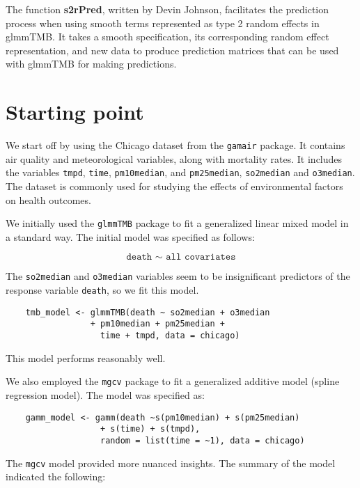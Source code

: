 
The function \textbf{s2rPred}, written by Devin Johnson, facilitates the prediction process when using smooth terms represented as type 2 random effects in glmmTMB. It takes a smooth specification, its corresponding random effect representation, and new data to produce prediction matrices that can be used with glmmTMB for making predictions.
\newline


\section{Starting point}

We start off by using the Chicago dataset from the \texttt{gamair} package. It contains air quality and meteorological variables, along with mortality rates. It includes the variables \texttt{tmpd}, \texttt{time}, \texttt{pm10median}, and \texttt{pm25median}, \texttt{so2median} and \texttt{o3median}. The dataset is commonly used for studying the effects of environmental factors on health outcomes.
\newline

We initially used the \texttt{glmmTMB} package to fit a generalized linear mixed model in a standard way. The initial model was specified as follows:

\[
\texttt{death $\sim$ all covariates}
\]

The \texttt{so2median} and \texttt{o3median} variables seem to be insignificant predictors of the response variable \texttt{death}, so we fit this model.

\begin{verbatim}
    tmb_model <- glmmTMB(death ~ so2median + o3median
                 + pm10median + pm25median + 
                   time + tmpd, data = chicago)
\end{verbatim}

This model performs reasonably well.
\newline

We also employed the \texttt{mgcv} package to fit a generalized additive model (spline regression model). The model was specified as:

\begin{verbatim}
    gamm_model <- gamm(death ~s(pm10median) + s(pm25median)
                   + s(time) + s(tmpd), 
                   random = list(time = ~1), data = chicago)
\end{verbatim}
\newline

The \texttt{mgcv} model provided more nuanced insights. The summary of the model indicated the following:


